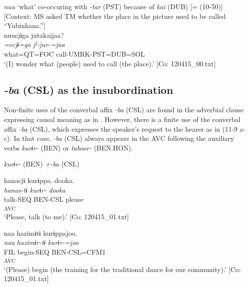 \ea\label{ex:11-8}  \textit{nuu} ‘what’ co-occuring with \textit{{}-tar} (PST) because of \textit{kai} (DUB) [= (10-50)]   [Context: MS asked TM whether the place in the picture used to be called “Yubinhana.”]\\
  
      \glll    nuucjɨga  jutakaijaa?\\
    \textit{=ccjɨ=ga}  \textit{jˀ-jur-=jaa}\\
    what=QT=FOC  call-UMRK-PST=DUB=SOL\\
    \glt     ‘(I) wonder what (people) used to call (the place).’ [Co: 120415\_00.txt]
\z

\subsection{\textit{{}-ba} (CSL) as the insubordination}\label{sec:11.2.2}

Non-finite uses of the converbal affix \textit{-ba} (CSL) are found in the adverbial clause expressing causal meaning as in . However, there is a finite use of the converbal affix \textit{-ba} (CSL), which expresses the speaker’s request to the hearer as in (11-9 a-c). In that case, \textit{{}-ba} (CSL) always appears in the AVC following the auxiliary verbs \textit{kurɨr-} (BEN) or \textit{taboor-} (BEN.HON).

\ea\label{ex:11-9}  \textit{kurɨr-} (BEN) \textit{+-ba} (CSL)

  \ea  
      \gllll    hanacjɨ  kurɨppa.  dooka.\\
      \textit{hanas-tɨ}  \textit{kurɨr-}  \textit{dooka}\\
      talk-SEQ  BEN-CSL  please\\
      [Lex. verb  Aux. verb]\textsubscript{AVC}  \\
      \glt ‘Please, talk (to me).’      [Co: 120415\_01.txt]

  \ex  
      \gllll    naa  hazimɨtɨ  kurɨppajoo.\\
      \textit{naa}  \textit{hazimɨr-tɨ}  \textit{kurɨr-=joo}\\
      FIL  begin-SEQ  BEN-CSL=CFM1\\
        [Lex. verb  Aux. verb]\textsubscript{AVC}\\
     \glt  ‘(Please) begin (the training for the traditional dance for our community).’      [Co: 120415\_01.txt]

